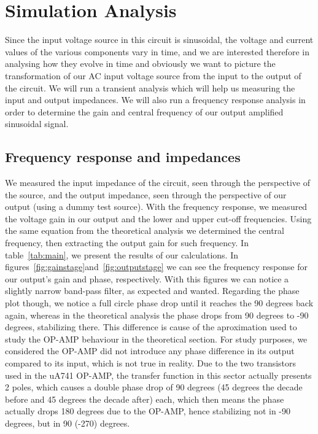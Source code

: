 \section{Simulation Analysis}
\label{sec:simulation}
Since the input voltage source in this circuit is sinusoidal, the voltage and current values of the various components vary in time, and we are interested therefore in analysing how they evolve in time and obviously we want to picture the transformation of our AC input voltage source from the input to the output of the circuit. We will run a transient analysis which will help us measuring the input and output impedances. We will also run a frequency response analysis in order to determine the gain and central frequency of our output amplified sinusoidal signal.

\subsection{Frequency response and impedances}
We measured the input impedance of the circuit, seen through the perspective of the source, and the output impedance, seen through the perspective of our output (using a dummy test source). With the frequency response, we measured the voltage gain in our output and the lower and upper cut-off frequencies. Using the same equation from the theoretical analysis we determined the central frequency, then extracting the output gain for such frequency. In table~\ref{tab:main}, we present the results of our calculations. In figures~\ref{fig:gainstage}and~\ref{fig:outputstage} we can see the frequency response for our output's gain and phase, respectively. With this figures we can notice a slightly narrow band-pass filter, as expected and wanted. Regarding the phase plot though, we notice a full circle phase drop until it reaches the 90 degrees back again, whereas in the theoretical analysis the phase drops from 90 degrees to -90 degrees, stabilizing there. This difference is cause of the aproximation used to study the OP-AMP behaviour in the theoretical section. For study purposes, we considered the OP-AMP did not introduce any phase difference in its output compared to its input, which is not true in reality. Due to the two transistors used in the uA741 OP-AMP, the transfer function in this sector actually presents 2 poles, which causes a double phase drop of 90 degrees (45 degrees the decade before and 45 degrees the decade after) each, which then means the phase actually drops 180 degrees due to the OP-AMP, hence stabilizing not in -90 degrees, but in 90 (-270) degrees.


